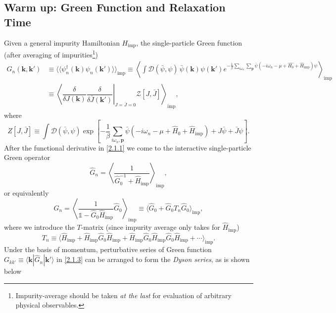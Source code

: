 \documentclass[aps,prx,superscriptaddress,onecolumn,preprintnumbers,nofootinbib,longbibliography]{revtex4-1}
\def\imp{\text{imp}}
\begin{document}
	\subsection{Warm up: Green Function and Relaxation Time}
		Given a general impurity Hamiltonian $H_\imp$, the single-particle Green function (after averaging of impurities\footnote{Impurity-average should be taken \emph{at the last} for evaluation of arbitrary physical observables.})
		\begin{align}
			G_n(\bm{k},\bm{k'})&\equiv\langle\langle\psi_n^\dagger(\bm{k})\psi_n(\bm{k'})\rangle\rangle_{\imp}\equiv\left\langle \int\mathcal{D}(\bar\psi,\psi)\,\bar\psi(\bm{k})\psi(\bm{k'})e^{-\frac{1}{\beta}\sum_{i\omega_n}\sum_{\bm{p}}\bar\psi(-i\omega_n-\mu+\hat{H_0}+\hat{H}_\imp)\psi}\right\rangle_\imp\nonumber\\
			&\equiv\left\langle\left.\dfrac{\delta}{\delta J(\bm{k})}\dfrac{\delta}{\delta\bar J(\bm{k'})}\right|_{J=\bar J=0}\mathcal{Z}[J,\bar{J}]\right\rangle_\imp,\label{2.1.1}
		\end{align}
		where
		\begin{equation*}
			Z[J,\bar J]\equiv\int\mathcal{D}(\bar\psi,\psi)\exp \left[-\dfrac{1}{\beta}\sum_{i\omega_n,\bm{p}}\bar\psi(-i\omega_n-\mu+\hat{H}_0+\hat{H}_\imp)+J\bar\psi+\bar J\psi\right].
		\end{equation*}
		After the functional derivative in \eqref{2.1.1} we come to the interactive single-particle Green operator
		\begin{equation}\label{2.1.2}
			\hat{G}_n=\left\langle\dfrac{1}{\hat{G}_0^{-1}+\hat{H}_\imp}\right\rangle_\imp,
		\end{equation}
		or equivalently
		\begin{equation}\label{2.1.3}
			\hat{G}_n=\left\langle\dfrac{1}{\mathds{1}-\hat{G}_0\hat{H}_\imp}\hat{G}_0\right\rangle_\imp\equiv\bigg\langle\hat{G}_0+\hat{G}_0 T_n\hat{G}_0\bigg\rangle_\imp,
		\end{equation}
		where we introduce the $T$-matrix (since impurity average only takes for $\hat{H}_\imp$)
		\begin{equation}\label{2.1.4}
			T_n\equiv\bigg\langle \hat{H}_\imp+\hat{H}_\imp\hat{G}_0\hat{H}_\imp+\hat{H}_\imp\hat{G}_0\hat{H}_\imp\hat{G}_0\hat{H}_\imp+\cdots\bigg\rangle_\imp.
		\end{equation}
		Under the basis of momentum, perturbative series of Green function $G_{kk'}\equiv\langle\bm{k}|\hat{G}_n|\bm{k'}\rangle$ in \eqref{2.1.3} can be arranged to form the \emph{Dyson series}, as is shown below
\end{document}
